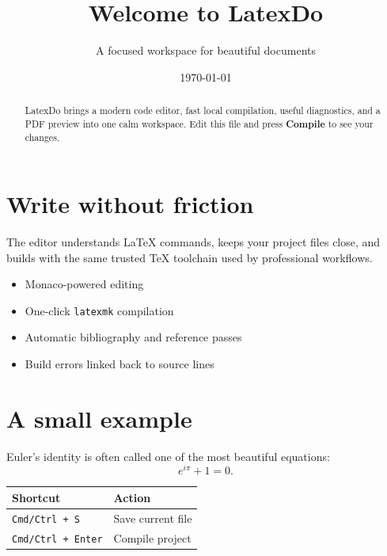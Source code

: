 \documentclass[11pt]{article}
\title{\textbf{\textcolor{latexdoblue}{Welcome to LatexDo}}}
\author{A focused workspace for beautiful documents}
\date{\today}
\begin{document}
\maketitle

\begin{abstract}
LatexDo brings a modern code editor, fast local compilation, useful diagnostics,
and a PDF preview into one calm workspace. Edit this file and press
\textbf{Compile} to see your changes.
\end{abstract}

\section{Write without friction}

The editor understands LaTeX commands, keeps your project files close, and
builds with the same trusted TeX toolchain used by professional workflows.

\begin{itemize}
  \item Monaco-powered editing
  \item One-click \texttt{latexmk} compilation
  \item Automatic bibliography and reference passes
  \item Build errors linked back to source lines
\end{itemize}

\section{A small example}

Euler's identity is often called one of the most beautiful equations:
\[
  e^{i\pi} + 1 = 0.
\]

\begin{table}[h]
  \centering
  \begin{tabular}{@{}ll@{}}
    \toprule
    Shortcut & Action \\
    \midrule
    \texttt{Cmd/Ctrl + S} & Save current file \\
    \texttt{Cmd/Ctrl + Enter} & Compile project \\
    \bottomrule
  \end{tabular}
\end{table}
\end{document}
